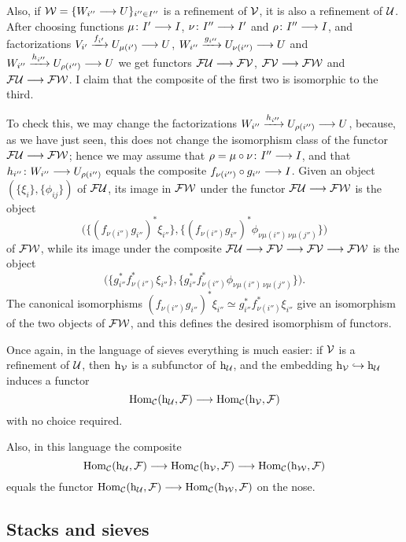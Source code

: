 \begin{4   STACKS}
\begin{4.1 Descent of objects of fibcats}
Also, if $\mathcal{W} = \{W_{i''} \longrightarrow U\}_{i'' \in I''}$ is a refinement of $\mathcal{V}$, it is also a refinement of $\mathcal{U}$. After choosing functions $\mu\colon I' \arr I$, $\nu\colon I'' \arr I'$ and $\rho\colon I'' \arr I$, and factorizations $V_{i'} \xrightarrow{f_{i'}} U_{\mu(i')} \arr U$, $W_{i''} \xrightarrow{g_{i''}} U_{\nu(i'')} \arr U$ and $W_{i''} \xrightarrow{h_{i''}} U_{\rho(i'')} \arr U$ we get functors $\cF\cU \arr \cF\cV$, $\cF\cV \arr \cF\cW$ and $\cF\cU \arr \cF\cW$. I claim that the composite of the first two is isomorphic to the third.

To check this, we may change the factorizations $W_{i''} \xrightarrow{h_{i''}} U_{\rho(i'')} \arr U$, because, as we have just seen, this does not change the isomorphism class of the functor $\cF\cU \arr \cF\cW$; hence we may assume that $\rho = \mu \circ \nu \colon I'' \arr I$, and that $h_{i''}\colon W_{i''} \arr U_{\rho(i'')}$ equals the composite $f_{\nu(i'')}\circ g_{i''} \arr I$. Given an object $(\{\xi_{i}\}, \{\phi_{ij}\})$ of $\mathcal{F}\mathcal{U}$, its image in $\mathcal{F}\mathcal{W}$ under the functor $\cF\cU \arr \cF\cW$ is the object
   \[
   \bigl(\{(f_{\nu(i'')} g_{i''})^{*}\xi_{i''}\},
      \{(f_{\nu(i'')} g_{i''})^{*}
      \phi_{\nu\mu(i'')\,\nu\mu(j'')}\}\bigr)
   \]
of $\mathcal{F}\mathcal{W}$, while its image under the composite $\cF\cU \arr \cF\cV \arr \cF\cV \arr \cF\cW$ is the object
   \[
   \bigl(\{g_{i''}^{*}f_{\nu(i'')}^{*}\xi_{i''}\},
      \{g_{i''}^{*}f_{\nu(i'')}^{*}
      \phi_{\nu\mu(i'')\,\nu\mu(j'')}\}\bigr).
   \]
The canonical isomorphisms $(f_{\nu(i'')} g_{i''})^{*}\xi_{i''} \simeq g_{i''}^{*}f_{\nu(i'')}^{*}\xi_{i''}$ give an isomorphism of the two objects of $\mathcal{F}\mathcal{W}$, and this defines the desired isomorphism of functors.

Once again, in the language of sieves everything is much easier: if $\mathcal{V}$ is a refinement of $\mathcal{U}$, then $\mathrm{h}_{\mathcal{V}}$ is a subfunctor of $\mathrm{h}_{\mathcal{U}}$, and the embedding $\mathrm{h}_{\mathcal{V}} \hookrightarrow \mathrm{h}_{\mathcal{U}}$ induces a functor
   \[
   \hom_{\cC}(\h_{\cU}, \cF) \arr \hom_{\cC}(\h_{\cV}, \cF)
   \]
with no choice required. 

Also, in this language the composite 
   \[
   \hom_{\cC}(\h_{\cU}, \cF) \arr \hom_{\cC}(\h_{\cV}, \cF)
                             \arr \hom_{\cC}(\h_{\cW}, \cF)
   \]
equals the functor $\hom_{\cC}(\h_{\cU}, \cF) \arr \hom_{\cC}(\h_{\cW}, \cF)$ on the nose.


\subsection{Stacks and sieves}



\end{4.1 Descent of objects of fibcats}
\end{4   STACKS}
